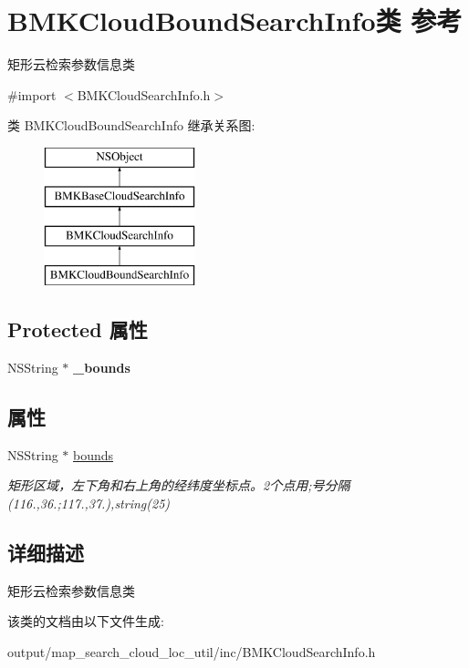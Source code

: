 \hypertarget{interface_b_m_k_cloud_bound_search_info}{\section{B\+M\+K\+Cloud\+Bound\+Search\+Info类 参考}
\label{interface_b_m_k_cloud_bound_search_info}
}


矩形云检索参数信息类  




{\ttfamily \#import $<$B\+M\+K\+Cloud\+Search\+Info.\+h$>$}

类 B\+M\+K\+Cloud\+Bound\+Search\+Info 继承关系图\+:\begin{figure}[H]
\begin{center}
\leavevmode
\includegraphics[height=4.000000cm]{interface_b_m_k_cloud_bound_search_info}
\end{center}
\end{figure}
\subsection*{Protected 属性}
\begin{DoxyCompactItemize}
\item 
\hypertarget{interface_b_m_k_cloud_bound_search_info_aab508b50d538d64dbd6e45d3280aa1d9}{N\+S\+String $\ast$ {\bfseries \+\_\+bounds}}\label{interface_b_m_k_cloud_bound_search_info_aab508b50d538d64dbd6e45d3280aa1d9}

\end{DoxyCompactItemize}
\subsection*{属性}
\begin{DoxyCompactItemize}
\item 
\hypertarget{interface_b_m_k_cloud_bound_search_info_a23623d581d1b1e81766d9c46048966cb}{N\+S\+String $\ast$ \hyperlink{interface_b_m_k_cloud_bound_search_info_a23623d581d1b1e81766d9c46048966cb}{bounds}}\label{interface_b_m_k_cloud_bound_search_info_a23623d581d1b1e81766d9c46048966cb}

\begin{DoxyCompactList}\small\item\em 矩形区域，左下角和右上角的经纬度坐标点。2个点用;号分隔(116.,36.;117.,37.),string(25) \end{DoxyCompactList}\end{DoxyCompactItemize}


\subsection{详细描述}
矩形云检索参数信息类 

该类的文档由以下文件生成\+:\begin{DoxyCompactItemize}
\item 
output/map\+\_\+search\+\_\+cloud\+\_\+loc\+\_\+util/inc/B\+M\+K\+Cloud\+Search\+Info.\+h\end{DoxyCompactItemize}
